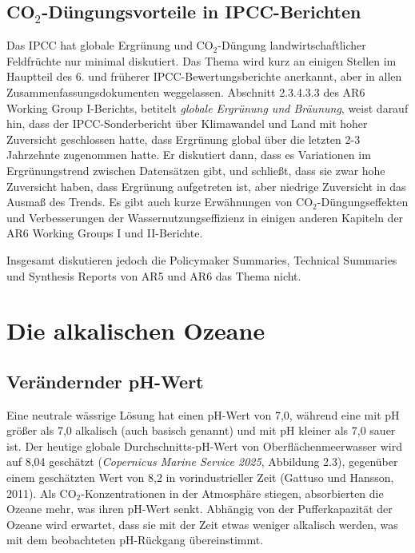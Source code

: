 \documentclass[12pt,paper=a4,DIV=12,parskip=never,chapterprefix=false,headings=standardclasses]{scrreprt}
\begin{document}
\subsection{CO$_2$-Düngungsvorteile in IPCC-Berichten}

Das IPCC hat globale Ergrünung und CO$_2$-Düngung landwirtschaftlicher Feldfrüchte nur minimal diskutiert. Das Thema wird kurz an einigen Stellen im Hauptteil des 6. und früherer IPCC-Bewertungsberichte anerkannt, aber in allen Zusammenfassungsdokumenten weggelassen. Abschnitt 2.3.4.3.3 des AR6 Working Group I-Berichts, betitelt \emph{globale Ergrünung und Bräunung}, weist darauf hin, dass der IPCC-Sonderbericht über Klimawandel und Land mit hoher Zuversicht geschlossen hatte, dass Ergrünung global über die letzten 2-3 Jahrzehnte zugenommen hatte. Er diskutiert dann, dass es Variationen im Ergrünungstrend zwischen Datensätzen gibt, und schließt, dass sie zwar hohe Zuversicht haben, dass Ergrünung aufgetreten ist, aber niedrige Zuversicht in das Ausmaß des Trends. Es gibt auch kurze Erwähnungen von CO$_2$-Düngungseffekten und Verbesserungen der Wassernutzungseffizienz in einigen anderen Kapiteln der AR6 Working Groups I und II-Berichte.

Insgesamt diskutieren jedoch die Policymaker Summaries, Technical Summaries und Synthesis Reports von AR5 und AR6 das Thema nicht.


\section{Die alkalischen Ozeane}

\subsection{Verändernder pH-Wert}

Eine neutrale wässrige Lösung hat einen pH-Wert von 7,0, während eine mit pH größer als 7,0 alkalisch (auch basisch genannt) und mit pH kleiner als 7,0 sauer ist. Der heutige globale Durchschnitts-pH-Wert von Oberflächenmeerwasser wird auf 8,04 geschätzt (\emph{Copernicus Marine Service 2025}, Abbildung 2.3), gegenüber einem geschätzten Wert von 8,2 in vorindustrieller Zeit (Gattuso und Hansson, 2011). Als CO$_2$-Konzentrationen in der Atmosphäre stiegen, absorbierten die Ozeane mehr, was ihren pH-Wert senkt. Abhängig von der Pufferkapazität der Ozeane wird erwartet, dass sie mit der Zeit etwas weniger alkalisch werden, was mit dem beobachteten pH-Rückgang übereinstimmt.
\end{document}
